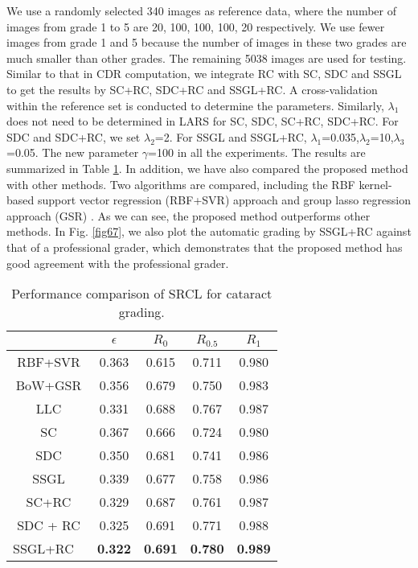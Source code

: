 \documentclass[journal]{IEEEtran}
\begin{document}
We use a randomly selected 340 images  as reference data,  where the number of images from grade 1 to 5 are 20, 100, 100, 100, 20 respectively. We use fewer images from grade 1 and 5 because the number of images in these two grades are much smaller than other grades.
  The remaining 5038 images are used for testing. Similar to that in CDR computation, we integrate RC with SC, SDC and SSGL to get the results by SC+RC, SDC+RC and SSGL+RC. A cross-validation within the reference set is conducted to determine the parameters.
  Similarly, $\lambda_1$ does not need to be determined in LARS for
  SC, SDC, SC+RC, SDC+RC. For SDC and SDC+RC, we set $\lambda_2$=2. For SSGL and SSGL+RC,
  $\lambda_1$=0.035,$\lambda_2$=10,$\lambda_3$=0.05. The new parameter $\gamma$=100 in all the experiments.
    The results are summarized in Table \ref{table3}. In addition, we have also compared the proposed method  with other methods. Two algorithms are compared, including the RBF  kernel-based support vector regression (RBF+SVR) approach \cite{5415679}   and    group lasso regression approach (GSR) \cite{Xu13}.   As we can see, the proposed method outperforms  other methods.
 In Fig. \ref{fig67}, we also plot the automatic grading by SSGL+RC against that of a professional grader,  which demonstrates that the proposed method has good agreement with the professional grader.
\begin{table}
	\caption{ Performance comparison of SRCL for cataract grading.
	} \begin{center}
		\begin{tabular}{c|c|c  |c|c } \hline
			& {$\epsilon$}  &   $R_0$ & $R_{0.5}$ & $R_1$
			\\\hline
			RBF+SVR \cite{5415679}  & 0.363 & 0.615 & 0.711 & 0.980 \\ \hline
			BoW+GSR \cite{Xu13} & 0.356 & 0.679 & 0.750   & 0.983 \\ \hline
	    	LLC \cite{yanwu2016} & 0.331 & 0.688 & 0.767 & 0.987 \\ \hline
			SC \cite{sparsecoding}   & 0.367& 0.666 & 0.724 & 0.980       \\\hline

			SDC \cite{CJ15}  & 0.350  &    0.681 & 0.741 & 0.986         \\\hline
				SSGL \cite{Cheng:17BOE}    & 0.339  &    0.677 & 0.758 & 0.986         \\\hline
			SC+RC & 0.329 & 0.687 & 0.761 & 0.987    \\\hline
			SDC + RC  & {0.325}   &   {0.691} &  {0.771} &  {0.988}       \\\hline
				SSGL+RC \  &  \textbf{0.322}  &     \textbf{0.691} &  \textbf{0.780} &  \textbf{0.989}        \\\hline

		\end{tabular}
	\end{center}
	\label{table3}
\end{table}
\end{document}
